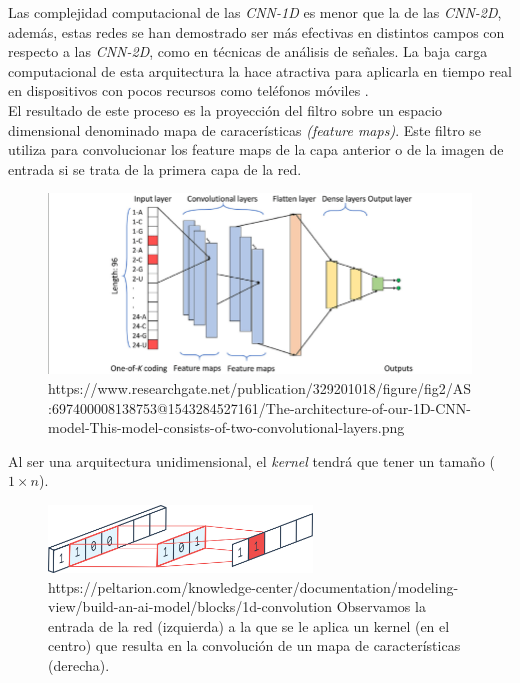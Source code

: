                 Las complejidad computacional de las \textit{CNN-1D} es menor que la de las \textit{CNN-2D}, además, estas redes se han demostrado ser más efectivas en distintos campos con respecto a las \textit{CNN-2D}, como en técnicas de análisis de señales. La baja carga computacional de esta arquitectura la hace atractiva para aplicarla en tiempo real en dispositivos con pocos recursos como teléfonos móviles \cite{Conv1D_Survey}.\\


                El resultado de este proceso es la proyección del filtro sobre un espacio dimensional denominado mapa de caracerísticas \textit{(feature maps)}. Este filtro se utiliza para convolucionar los feature maps de la capa anterior \cite{FiltersFeatureMaps} o de la imagen de entrada si se trata de la primera capa de la red.
                

                \begin{figure}[h]
                    \centering
                    \includegraphics[width=15cm]{archivos/3.Tecnologias/RedesNeuronales/CNN/1D/1CNNArchImage}
                    \caption{https://www.researchgate.net/publication/329201018/figure/fig2/AS:697400008138753@1543284527161/The-architecture-of-our-1D-CNN-model-This-model-consists-of-two-convolutional-layers.png}
                    \label{1CNNArchImage}
                \end{figure}


                Al ser una arquitectura unidimensional, el \textit{kernel} tendrá que tener un tamaño ($1 \times n$).

                \begin{figure}[h]
                    \centering
                    \includegraphics[width=7cm]{archivos/3.Tecnologias/RedesNeuronales/CNN/1D/1DConvolution}
                    \caption{https://peltarion.com/knowledge-center/documentation/modeling-view/build-an-ai-model/blocks/1d-convolution Observamos la entrada de la red (izquierda) a la que se le aplica un kernel (en el centro) que resulta en la convolución de un mapa de características (derecha).}
                    \label{1DConvolutionImage}
                \end{figure}


